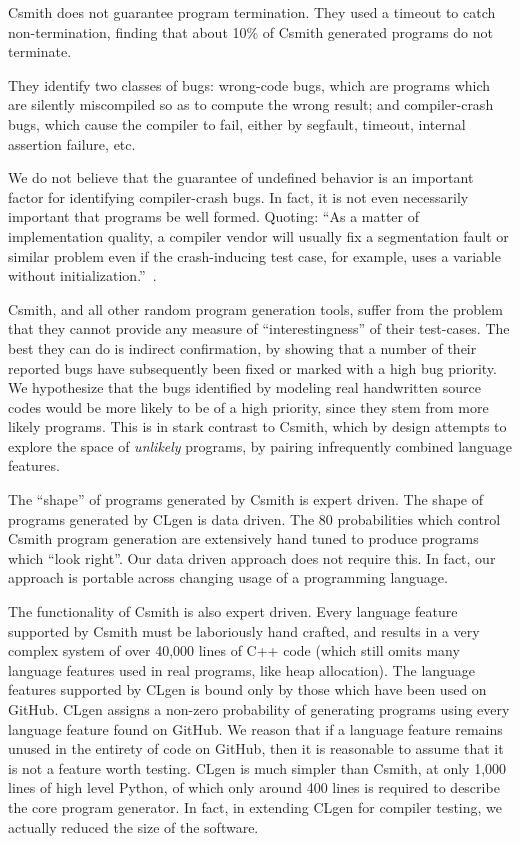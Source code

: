 Csmith does not guarantee program termination. They used a timeout to catch non-termination, finding that about 10\% of Csmith generated programs do not terminate.

They identify two classes of bugs: wrong-code bugs, which are programs which are silently miscompiled so as to compute the wrong result; and compiler-crash bugs, which cause the compiler to fail, either by segfault, timeout, internal assertion failure, etc.

We do not believe that the guarantee of undefined behavior is an important factor for identifying compiler-crash bugs. In fact, it is not even necessarily important that programs be well formed. Quoting: ``As a matter of implementation quality, a compiler vendor will usually fix a segmentation fault or similar problem even if the crash-inducing test case, for example, uses a variable without initialization.''~\cite{Regehr2012a}.

Csmith, and all other random program generation tools, suffer from the problem that they cannot provide any measure of ``interestingness'' of their test-cases. The best they can do is indirect confirmation, by showing that a number of their reported bugs have subsequently been fixed or marked with a high bug priority. We hypothesize that the bugs identified by modeling real handwritten source codes would be more likely to be of a high priority, since they stem from more likely programs. This is in stark contrast to Csmith, which by design attempts to explore the space of \emph{unlikely} programs, by pairing infrequently combined language features.

The ``shape'' of programs generated by Csmith is expert driven. The shape of programs generated by CLgen is data driven. The 80 probabilities which control Csmith program generation are extensively hand tuned to produce programs which ``look right''. Our data driven approach does not require this. In fact, our approach is portable across changing usage of a programming language.

The functionality of Csmith is also expert driven. Every language feature supported by Csmith must be laboriously hand crafted, and results in a very complex system of over 40,000 lines of C++ code (which still omits many language features used in real programs, like heap allocation). The language features supported by CLgen is bound only by those which have been used on GitHub. CLgen assigns a non-zero probability of generating programs using every language feature found on GitHub. We reason that if a language feature remains unused in the entirety of code on GitHub, then it is reasonable to assume that it is not a feature worth testing. CLgen is much simpler than Csmith, at only 1,000 lines of high level Python, of which only around 400 lines is required to describe the core program generator. In fact, in extending CLgen for compiler testing, we actually reduced the size of the software.

